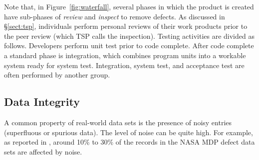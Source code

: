 \documentclass[smallcondensed]{svjour3}
\begin{document}

Note that, in Figure~\ref{fig:waterfall}, several  phases in which the product is created have sub-phases of {\em review} and {\em inspect} to remove defects. As discussed in \S\ref{sect:tsp}, individuals perform personal reviews of their work products prior to the peer review (which TSP calls the inspection). Testing activities are divided as follows. Developers perform unit test prior to code complete.  After code complete a standard phase is integration, which combines program units into a workable system ready for system test. Integration,  system test, and acceptance test are often performed by another group. 


    
 
\subsection{Data Integrity}
\label{sec:data_integrity}

A common property of real-world data sets is the presence
of noisy entries (superfluous  or spurious data). 
The level of noise can be quite high. For example, as reported
in \cite{shepperd12}, around
10\% to 30\%
of the records in the NASA MDP defect data sets are
affected by noise. 
\end{document}
